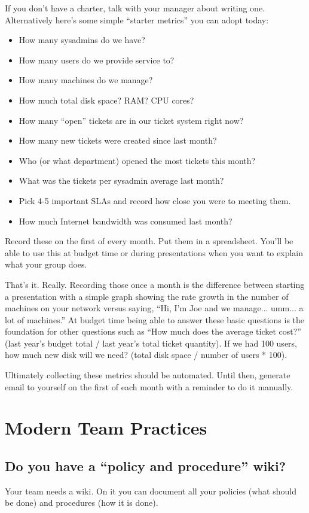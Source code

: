 \documentclass{article}
\begin{document}
If you don't have a charter, talk with your manager about writing one. Alternatively here's some simple ``starter metrics'' you can adopt today:

\begin{itemize}
    \item How many sysadmins do we have?
    \item How many users do we provide service to?
    \item How many machines do we manage?
    \item How much total disk space? RAM? CPU cores?
    \item How many ``open'' tickets are in our ticket system right now?
    \item How many new tickets were created since last month?
    \item Who (or what department) opened the most tickets this month?
    \item What was the tickets per sysadmin average last month?
    \item Pick 4-5 important SLAs and record how close you were to meeting them.
    \item How much Internet bandwidth was consumed last month?
\end{itemize}

Record these on the first of every month. Put them in a spreadsheet. You'll be able to use this at budget time or during presentations when you want to explain what your group does.

That's it. Really. Recording those once a month is the difference between starting a presentation with a simple graph showing the rate growth in the number of machines on your network versus saying, ``Hi, I'm Joe and we manage... umm... a lot of machines.'' At budget time being able to answer these basic questions is the foundation for other questions such as ``How much does the average ticket cost?'' (last year's budget total / last year's total ticket quantity). If we had 100 users, how much new disk will we need? (total disk space / number of users * 100).

Ultimately collecting these metrics should be automated. Until then, generate email to yourself on the first of each month with a reminder to do it manually.

\section{Modern Team Practices}
\subsection{Do you have a ``policy and procedure'' wiki?}
Your team needs a wiki. On it you can document all your policies (what should be done) and procedures (how it is done).
\end{document}

